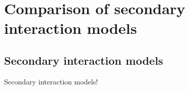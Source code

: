 
%
%

\section{Comparison of secondary interaction models}\label{Section_Model}

\subsection{Secondary interaction models}
\vs\hs Secondary interaction models!

\newpage
